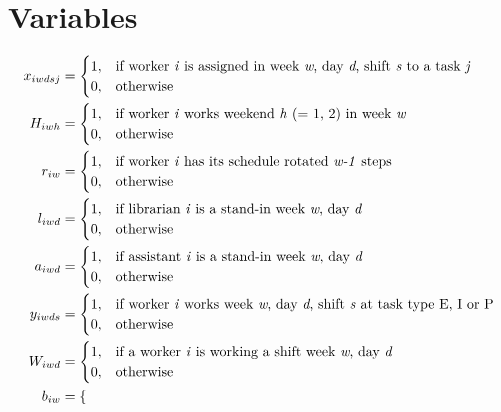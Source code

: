 \section{Variables} \label{variabs}
\begin{align}
    x_{iwdsj}&=
    \begin{cases}
      1, & \text{if worker \textit{i} is assigned in week \textit{w}, day \textit{d}, shift \textit{s} to a task \textit{j}}\\
      0, & \text{otherwise}
    \end{cases}
    \\
    H_{iwh}&=
    \begin{cases}
      1, & \text{if worker \textit{i} works weekend \textit{h} (= 1, 2) in week \textit{w}}\\
      0, & \text{otherwise}
    \end{cases}
	\\
	r_{iw}&=
	\begin{cases}
		1, & \text{if worker \textit{i} has its schedule rotated \textit{w-1} steps}\\
		0, & \text{otherwise}
	\end{cases}
	\\
	l_{iwd}&=
	\begin{cases}
	  1, & \text{if librarian \textit{i} is a stand-in week \textit{w}, day \textit{d}} \\
	  0, & \text{otherwise}
	\end{cases}
	\\
	a_{iwd}&=
	\begin{cases}
 		1, & \text{if assistant \textit{i} is a stand-in week \textit{w}, day \textit{d}} \\
 		0, & \text{otherwise}
	\end{cases}
	\\
	y_{iwds}&=
	\begin{cases}
 		1, & \text{if worker \textit{i} works week \textit{w}, day \textit{d}, shift \textit{s} at task type E, I or P} \\
 		0, & \text{otherwise}
	\end{cases}
	\\
	W_{iwd}&=
	\begin{cases}
	 	1, & \text{if a worker \textit{i} is working a shift week \textit{w}, day \textit{d}} \\
	 	0, & \text{otherwise}
	\end{cases}
	\\
	b_{iw}&=
	\begin{cases}

\end{cases}
\end{align}
